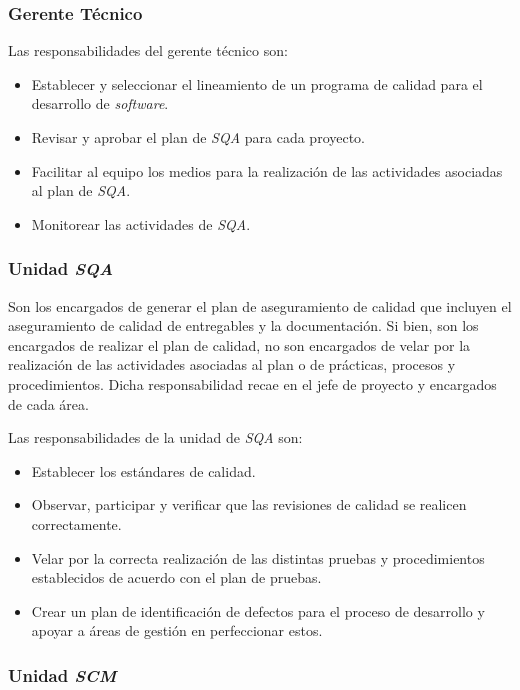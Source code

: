 \subsubsection{Gerente Técnico}

Las responsabilidades del gerente técnico son:

	\begin{itemize}
		\item 
		 Establecer y seleccionar el lineamiento de un programa de calidad para el desarrollo de \emph{software}.
		\item
		 Revisar y aprobar el plan de \emph{SQA} para cada proyecto. 
		 \item
		 Facilitar al equipo los medios para la realización de las actividades asociadas al plan de \emph{SQA}.
		 \item 
		 Monitorear las actividades de \emph{SQA}.
	\end{itemize}

\subsubsection{Unidad \emph{SQA}}

Son los encargados de generar el plan de aseguramiento de calidad que incluyen el aseguramiento de calidad de entregables y la documentación. Si bien, son los encargados de realizar el plan de calidad, no son encargados de velar por la realización de las actividades asociadas al plan o de prácticas, procesos y procedimientos. Dicha responsabilidad recae en el jefe de proyecto y encargados de cada área.

Las responsabilidades de la unidad de \emph{SQA} son: 

	\begin{itemize}
		\item 
		 Establecer los estándares de calidad.
		\item
		 Observar, participar y verificar que las revisiones de calidad se realicen correctamente. 
		 \item
		Velar por la correcta realización de las distintas pruebas y procedimientos establecidos de acuerdo con el plan de pruebas.
		 \item 
		Crear un plan de identificación de defectos para el proceso de desarrollo y apoyar a áreas de gestión en perfeccionar estos.
	\end{itemize}

\subsubsection{Unidad \emph{SCM}}

